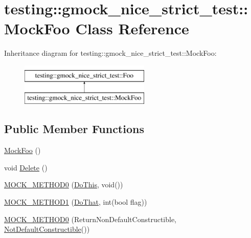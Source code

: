 \hypertarget{classtesting_1_1gmock__nice__strict__test_1_1MockFoo}{}\section{testing\+::gmock\+\_\+nice\+\_\+strict\+\_\+test\+::Mock\+Foo Class Reference}
\label{classtesting_1_1gmock__nice__strict__test_1_1MockFoo}
Inheritance diagram for testing\+::gmock\+\_\+nice\+\_\+strict\+\_\+test\+::Mock\+Foo\+:\begin{figure}[H]
\begin{center}
\leavevmode
\includegraphics[height=2.000000cm]{classtesting_1_1gmock__nice__strict__test_1_1MockFoo}
\end{center}
\end{figure}
\subsection*{Public Member Functions}
\begin{DoxyCompactItemize}
\item 
\mbox{\hyperlink{classtesting_1_1gmock__nice__strict__test_1_1MockFoo_a43a103497aa475d4b1700f5116b35ef3}{Mock\+Foo}} ()
\item 
void \mbox{\hyperlink{classtesting_1_1gmock__nice__strict__test_1_1MockFoo_a7bdec6a6353e4396d551dbf8f2beac54}{Delete}} ()
\item 
\mbox{\hyperlink{classtesting_1_1gmock__nice__strict__test_1_1MockFoo_a14ee661ebc461096824e876a9308840e}{M\+O\+C\+K\+\_\+\+M\+E\+T\+H\+O\+D0}} (\mbox{\hyperlink{classtesting_1_1gmock__nice__strict__test_1_1Foo_a79a3cdbd8d9d9f6bc87580563b0d7cec}{Do\+This}}, void())
\item 
\mbox{\hyperlink{classtesting_1_1gmock__nice__strict__test_1_1MockFoo_a3a7bfcf303a2c8578db900c9525b02a1}{M\+O\+C\+K\+\_\+\+M\+E\+T\+H\+O\+D1}} (\mbox{\hyperlink{classtesting_1_1gmock__nice__strict__test_1_1Foo_a8527a459b03f333a809a3376311a9f8b}{Do\+That}}, int(bool flag))
\item 
\mbox{\hyperlink{classtesting_1_1gmock__nice__strict__test_1_1MockFoo_a2d69a27a8789f04938cb1eb0047bb677}{M\+O\+C\+K\+\_\+\+M\+E\+T\+H\+O\+D0}} (Return\+Non\+Default\+Constructible, \mbox{\hyperlink{classtesting_1_1gmock__nice__strict__test_1_1NotDefaultConstructible}{Not\+Default\+Constructible}}())
\end{DoxyCompactItemize}


